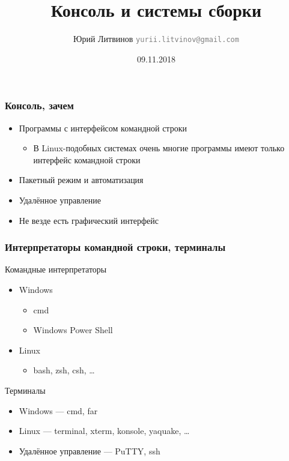 \documentclass[xetex,mathserif,serif]{beamer}
\title{Консоль и системы сборки}
\author[Юрий Литвинов]{Юрий Литвинов \newline \textcolor{gray}{\small\texttt{yurii.litvinov@gmail.com}}}
\date{09.11.2018}
\begin{document}
	
	\frame{\titlepage}

	\begin{frame}
		\frametitle{Консоль, зачем}
		\begin{itemize}
			\item Программы с интерфейсом командной строки
			\begin{itemize}
				\item В Linux-подобных системах очень многие программы имеют только интерфейс командной строки
			\end{itemize}
			\item Пакетный режим и автоматизация
			\item Удалённое управление
			\item Не везде есть графический интерфейс
		\end{itemize}
	\end{frame}

	\begin{frame}
		\frametitle{Интерпретаторы командной строки, терминалы}
		Командные интерпретаторы
		\begin{itemize}
			\item Windows
			\begin{itemize}
				\item cmd
				\item Windows Power Shell
			\end{itemize}
			\item Linux
			\begin{itemize}
				\item bash, zsh, csh, …
			\end{itemize}
		\end{itemize}
		Терминалы
		\begin{itemize}
			\item Windows --- cmd, far
			\item Linux --- terminal, xterm, konsole, yaquake, …
			\item Удалённое управление --- PuTTY, ssh
		\end{itemize}
	\end{frame}
\end{document}

